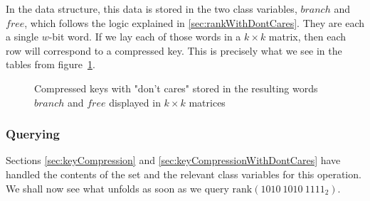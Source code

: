 In the data structure, this data is stored in the two class variables, $branch$ and $free$, which follows the logic explained in \ref{sec:rankWithDontCares}. They are each a single $w$-bit word. If we lay each of those words in a $k \times k$ matrix, then each row will correspond to a compressed key. This is precisely what we see in the tables from figure~\ref{fig:branchAndFreeCompressedKeys}.%

\begin{figure}[H]
\centering

\caption[Example of how the compressed keys with "don't cares" are stored in the instance variables $branch$ and $free$]{Compressed keys with "don't cares" stored in the resulting words $branch$ and $free$ displayed in $k \times k$ matrices}
\label{fig:branchAndFreeCompressedKeys}
\end{figure}

% 

\subsubsection{Querying} \label{sec:rankDontCaresQuery}

Sections \ref{sec:keyCompression} and \ref{sec:keyCompressionWithDontCares} have handled the contents of the set and the relevant class variables for this operation. We shall now see what unfolds as soon as we query $\text{rank}(1010\ 1010\ 1111_2)$.

